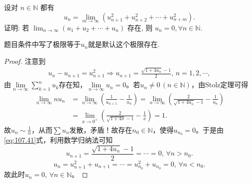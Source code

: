 \documentclass[../../main.tex]{subfiles}
\begin{document}
\begin{example}
设对 \( n \in \mathbb{N} \) 都有
\[
u_n = \lim_{m \to \infty} (u_{n+1}^2 + u_{n+2}^2 + \cdots + u_{n+m}^2).
\]
证明: 若 \( \lim_{n \to \infty} (u_1 + u_2 + \cdots + u_n) \) 存在, 则 \( u_n = 0, \forall n \in \mathbb{N} \).
\end{example}
\begin{remark}
题目条件中写了极限等于$u_n$就是默认这个极限存在.
\end{remark}
\begin{proof}
注意到
\begin{align}
u_n - u_{n+1} = u_{n+1}^2 \Longrightarrow u_{n+1} = \frac{\sqrt{1 + 4u_n} - 1}{2}, \, n = 1, 2, \cdots, \label{eq:107.41}
\end{align}
由$\lim\limits_{n \to \infty} \sum_{k=1}^n u_k$存在知，$\lim\limits_{n \to \infty} u_n = 0$。若$u_n \neq 0 \, (n \in \mathbb{N})$，由Stolz定理可得
\begin{align*}
\lim_{n \to \infty} n u_n &= \lim_{n \to \infty} \left( \frac{1}{u_{n+1}} - \frac{1}{u_n} \right) = \lim_{n \to \infty} \left( \frac{2}{\sqrt{1 + 4u_n} - 1} - \frac{1}{u_n} \right) \\
&= \lim_{x \to 0^+} \left( \frac{2}{\sqrt{1 + 4x} - 1} - \frac{1}{x} \right) = 1.
\end{align*}
故$u_n \sim \frac{1}{n}$，从而$\sum u_n$发散，矛盾！故存在$n_0 \in \mathbb{N}$，使得$u_{n_0} = 0$。于是由\eqref{eq:107.41}式，利用数学归纳法可知
\[
u_{n+1} = \frac{\sqrt{1 + 4u_n} - 1}{2} = \cdots = 0, \, \forall n > n_0.
\]
\[
u_n = u_{n+1}^2 + u_{n+1} = \cdots = u_{n_0}^2 + u_{n_0} = 0, \, \forall n < n_0.
\]
故此时$u_n = 0, \, \forall n \in \mathbb{N}$。

\end{proof}
\end{document}
